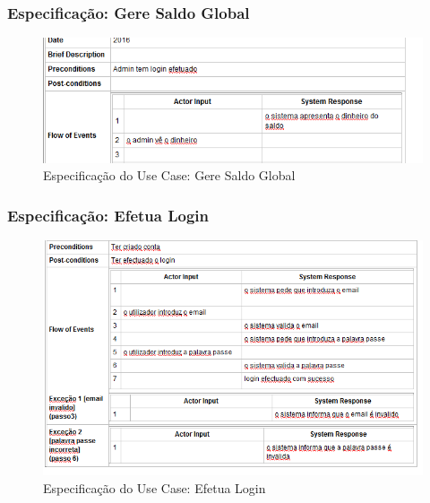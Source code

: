 \newpage
\subsubsection{Especificação: Gere Saldo Global }

\begin{figure}[htb!]
	\centering
	\includegraphics[scale=0.6]{imagens/Especificacoes/geresaldoglobal}  
	\caption{Especificação do Use Case: Gere Saldo Global  }  
\end{figure}


\subsubsection{Especificação: Efetua Login }

\begin{figure}[htb!]
	\centering
	\includegraphics[scale=0.6]{imagens/Especificacoes/efetualogin}  
	\caption{Especificação do Use Case: Efetua Login  }  
\end{figure}

\newpage

